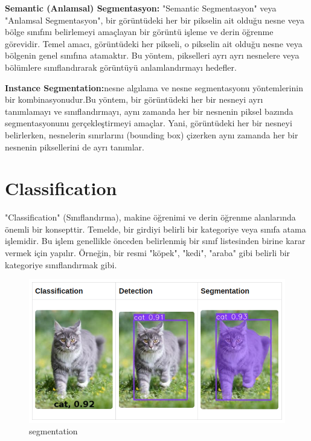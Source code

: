 \documentclass[11pt,a4paper]{report}
\begin{document}
    \textbf{Semantic (Anlamsal) Segmentasyon:} "Semantic Segmentasyon" veya "Anlamsal Segmentasyon", bir görüntüdeki her bir pikselin ait olduğu nesne veya bölge sınıfını belirlemeyi amaçlayan bir görüntü işleme ve derin öğrenme görevidir. Temel amacı, görüntüdeki her pikseli, o pikselin ait olduğu nesne veya bölgenin genel sınıfına atamaktır. Bu yöntem, pikselleri ayrı ayrı nesnelere veya bölümlere sınıflandırarak görüntüyü anlamlandırmayı hedefler.
    \newline
    
    \textbf{Instance Segmentation:}nesne algılama ve nesne segmentasyonu yöntemlerinin bir kombinasyonudur.Bu yöntem, bir görüntüdeki her bir nesneyi ayrı tanımlamayı ve sınıflandırmayı, aynı zamanda her bir nesnenin piksel bazında segmentasyonunu gerçekleştirmeyi amaçlar. Yani, görüntüdeki her bir nesneyi belirlerken, nesnelerin sınırlarını (bounding box) çizerken aynı zamanda her bir nesnenin piksellerini de ayrı tanımlar.
    
    \section{Classification}
    
    "Classification" (Sınıflandırma), makine öğrenimi ve derin öğrenme alanlarında önemli bir konsepttir. Temelde, bir girdiyi belirli bir kategoriye veya sınıfa atama işlemidir. Bu işlem genellikle önceden belirlenmiş bir sınıf listesinden birine karar vermek için yapılır. Örneğin, bir resmi "köpek", "kedi", "araba" gibi belirli bir kategoriye sınıflandırmak gibi.\cite{Segmentasyon}
    
    \begin{figure}[!h]
    	\centering
    	\includegraphics[width=\textwidth]{compvision}
    	\caption{segmentation}
    	\label{fig:ornek7}
    \end{figure}
    
\end{document}
